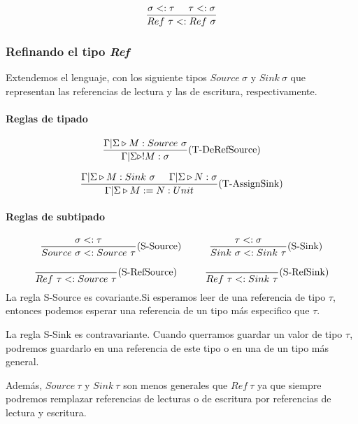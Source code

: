 $$\frac{\sigma <: \tau\hspace*{5mm} \tau <: \sigma}{Ref~\tau <: Ref~\sigma}$$

\subsubsection{Refinando el tipo \textit{Ref}}
Extendemos el lenguaje, con los siguiente tipos $Source~\sigma$ y $Sink~\sigma$ que representan las referencias de lectura y las de escritura, respectivamente. 

\paragraph{Reglas de tipado}

\begin{align*}
\frac{\Gamma|\Sigma\triangleright M : Source~\sigma}{\Gamma|\Sigma\triangleright !M : \sigma}(\text{T-DeRefSource})
\end{align*}

\begin{align*}
\frac{\Gamma|\Sigma\triangleright M : Sink~\sigma\hspace*{5mm} \Gamma|\Sigma\triangleright N : \sigma}{\Gamma|\Sigma\triangleright M := N : Unit}(\text{T-AssignSink})
\end{align*}

\paragraph{Reglas de subtipado}
\begin{align*}
\frac{\sigma <: \tau}{Source~\sigma <: Source~\tau}(\text{S-Source})\hspace*{1cm}\frac{\tau <: \sigma}{Sink~\sigma <: Sink~\tau}(\text{S-Sink})
\end{align*}

\begin{align*}
\frac{}{Ref~\tau <: Source~\tau}(\text{S-RefSource})\hspace*{1cm}\frac{}{Ref~\tau <: Sink~\tau}(\text{S-RefSink})
\end{align*}
La regla S-Source es covariante.Si esperamos leer de una referencia de tipo $\tau$, entonces podemos esperar una referencia de un tipo más especifico que $\tau$. 

La regla S-Sink es contravariante. Cuando querramos guardar un valor de tipo $\tau$, podremos guardarlo en una referencia de este tipo o en una de un tipo más general.

Además, $Source~\tau$ y $Sink~\tau$ son menos generales que $Ref~\tau$ ya que siempre podremos remplazar referencias de lecturas o de escritura por referencias de lectura y escritura.